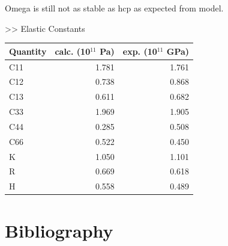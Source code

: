 \documentclass[11pt]{article}
\begin{document}
Omega is still not as stable as hcp as expected from model. 


>> Elastic Constants

\begin{center}
\begin{tabular}{lrr}
Quantity & calc. (10\(^{\text{11}}\) Pa) & exp. (10\(^{\text{11}}\) GPa)\\
\hline
C11 & 1.781 & 1.761\\
C12 & 0.738 & 0.868\\
C13 & 0.611 & 0.682\\
C33 & 1.969 & 1.905\\
C44 & 0.285 & 0.508\\
C66 & 0.522 & 0.450\\
K & 1.050 & 1.101\\
R & 0.669 & 0.618\\
H & 0.558 & 0.489\\
\end{tabular}
\end{center}

\section{Bibliography}
\label{sec:orge31af3c}
\label{orgc315246}



\end{document}
